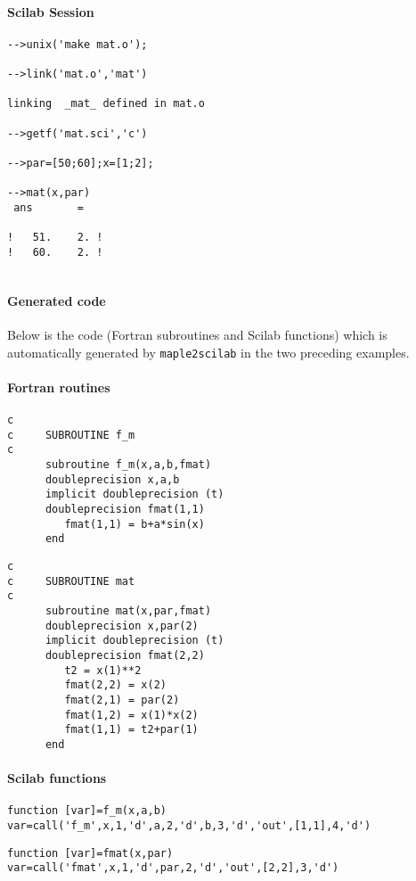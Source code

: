 \paragraph{Scilab Session}
\begin{verbatim}
-->unix('make mat.o');

-->link('mat.o','mat') 

linking  _mat_ defined in mat.o  
 
-->getf('mat.sci','c')

-->par=[50;60];x=[1;2];
 
-->mat(x,par)
 ans       =
 
!   51.    2. !
!   60.    2. !
 
\end{verbatim}

{\small
\paragraph{Generated code}
Below is the code (Fortran subroutines and Scilab functions) which is 
automatically generated by {\tt maple2scilab} in the two preceding  examples.
\paragraph{Fortran routines}
\begin{verbatim}
c      
c     SUBROUTINE f_m
c      
      subroutine f_m(x,a,b,fmat)
      doubleprecision x,a,b
      implicit doubleprecision (t)
      doubleprecision fmat(1,1)
         fmat(1,1) = b+a*sin(x)
      end
\end{verbatim}
\begin{verbatim}
c      
c     SUBROUTINE mat
c      
      subroutine mat(x,par,fmat)
      doubleprecision x,par(2)
      implicit doubleprecision (t)
      doubleprecision fmat(2,2)
         t2 = x(1)**2
         fmat(2,2) = x(2)
         fmat(2,1) = par(2)
         fmat(1,2) = x(1)*x(2)
         fmat(1,1) = t2+par(1)
      end
\end{verbatim}
\paragraph{Scilab functions}
\begin{verbatim}
function [var]=f_m(x,a,b)
var=call('f_m',x,1,'d',a,2,'d',b,3,'d','out',[1,1],4,'d')
\end{verbatim}
\begin{verbatim}
function [var]=fmat(x,par)
var=call('fmat',x,1,'d',par,2,'d','out',[2,2],3,'d')
\end{verbatim}
}
%



